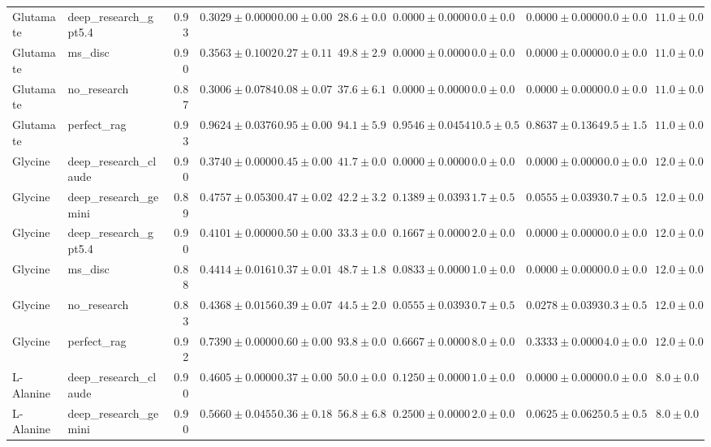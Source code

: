 \begin{table}[htbp]
\begin{tabular}{llrrrrrrrrr}
Glutamate & deep_research_gpt5.4 & 0.93 & $0.3029 \pm 0.0000$ & $0.00 \pm 0.00$ & $28.6 \pm 0.0$ & $0.0000 \pm 0.0000$ & $0.0 \pm 0.0$ & $0.0000 \pm 0.0000$ & $0.0 \pm 0.0$ & $11.0 \pm 0.0$ \\
Glutamate & ms_disc & 0.90 & $0.3563 \pm 0.1002$ & $0.27 \pm 0.11$ & $49.8 \pm 2.9$ & $0.0000 \pm 0.0000$ & $0.0 \pm 0.0$ & $0.0000 \pm 0.0000$ & $0.0 \pm 0.0$ & $11.0 \pm 0.0$ \\
Glutamate & no_research & 0.87 & \cellcolor{red!25}$0.3006 \pm 0.0784$ & $0.08 \pm 0.07$ & $37.6 \pm 6.1$ & $0.0000 \pm 0.0000$ & $0.0 \pm 0.0$ & $0.0000 \pm 0.0000$ & $0.0 \pm 0.0$ & $11.0 \pm 0.0$ \\
Glutamate & perfect_rag & 0.93 & \cellcolor{green!25}$0.9624 \pm 0.0376$ & $0.95 \pm 0.00$ & $94.1 \pm 5.9$ & $0.9546 \pm 0.0454$ & $10.5 \pm 0.5$ & $0.8637 \pm 0.1364$ & $9.5 \pm 1.5$ & $11.0 \pm 0.0$ \\
\midrule
Glycine & deep_research_claude & 0.90 & \cellcolor{red!25}$0.3740 \pm 0.0000$ & $0.45 \pm 0.00$ & $41.7 \pm 0.0$ & $0.0000 \pm 0.0000$ & $0.0 \pm 0.0$ & $0.0000 \pm 0.0000$ & $0.0 \pm 0.0$ & $12.0 \pm 0.0$ \\
Glycine & deep_research_gemini & 0.89 & $0.4757 \pm 0.0530$ & $0.47 \pm 0.02$ & $42.2 \pm 3.2$ & $0.1389 \pm 0.0393$ & $1.7 \pm 0.5$ & $0.0555 \pm 0.0393$ & $0.7 \pm 0.5$ & $12.0 \pm 0.0$ \\
Glycine & deep_research_gpt5.4 & 0.90 & $0.4101 \pm 0.0000$ & $0.50 \pm 0.00$ & $33.3 \pm 0.0$ & $0.1667 \pm 0.0000$ & $2.0 \pm 0.0$ & $0.0000 \pm 0.0000$ & $0.0 \pm 0.0$ & $12.0 \pm 0.0$ \\
Glycine & ms_disc & 0.88 & $0.4414 \pm 0.0161$ & $0.37 \pm 0.01$ & $48.7 \pm 1.8$ & $0.0833 \pm 0.0000$ & $1.0 \pm 0.0$ & $0.0000 \pm 0.0000$ & $0.0 \pm 0.0$ & $12.0 \pm 0.0$ \\
Glycine & no_research & 0.83 & $0.4368 \pm 0.0156$ & $0.39 \pm 0.07$ & $44.5 \pm 2.0$ & $0.0555 \pm 0.0393$ & $0.7 \pm 0.5$ & $0.0278 \pm 0.0393$ & $0.3 \pm 0.5$ & $12.0 \pm 0.0$ \\
Glycine & perfect_rag & 0.92 & \cellcolor{green!25}$0.7390 \pm 0.0000$ & $0.60 \pm 0.00$ & $93.8 \pm 0.0$ & $0.6667 \pm 0.0000$ & $8.0 \pm 0.0$ & $0.3333 \pm 0.0000$ & $4.0 \pm 0.0$ & $12.0 \pm 0.0$ \\
\midrule
L-Alanine & deep_research_claude & 0.90 & $0.4605 \pm 0.0000$ & $0.37 \pm 0.00$ & $50.0 \pm 0.0$ & $0.1250 \pm 0.0000$ & $1.0 \pm 0.0$ & $0.0000 \pm 0.0000$ & $0.0 \pm 0.0$ & $8.0 \pm 0.0$ \\
L-Alanine & deep_research_gemini & 0.90 & $0.5660 \pm 0.0455$ & $0.36 \pm 0.18$ & $56.8 \pm 6.8$ & $0.2500 \pm 0.0000$ & $2.0 \pm 0.0$ & $0.0625 \pm 0.0625$ & $0.5 \pm 0.5$ & $8.0 \pm 0.0$ \\

\end{tabular}
\end{table}
